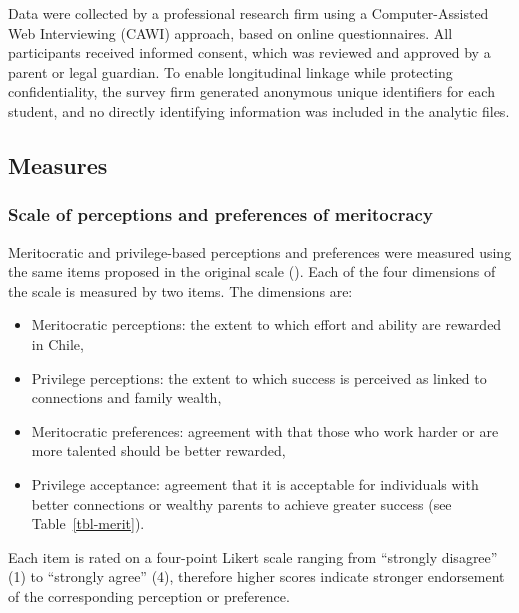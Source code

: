 \documentclass[
  13pt,
]{article}
\begin{document}
Data were collected by a professional research firm using a
Computer-Assisted Web Interviewing (CAWI) approach, based on online
questionnaires. All participants received informed consent, which was
reviewed and approved by a parent or legal guardian. To enable
longitudinal linkage while protecting confidentiality, the survey firm
generated anonymous unique identifiers for each student, and no directly
identifying information was included in the analytic files.

\subsection{Measures}\label{measures}

\subsubsection{Scale of perceptions and preferences of
meritocracy}\label{scale-of-perceptions-and-preferences-of-meritocracy}

Meritocratic and privilege-based perceptions and preferences were
measured using the same items proposed in the original scale
().
Each of the four dimensions of the scale is measured by two items. The
dimensions are:

\begin{itemize}
\item
  Meritocratic perceptions: the extent to which effort and ability are
  rewarded in Chile,
\item
  Privilege perceptions: the extent to which success is perceived as
  linked to connections and family wealth,
\item
  Meritocratic preferences: agreement with that those who work harder or
  are more talented should be better rewarded,
\item
  Privilege acceptance: agreement that it is acceptable for individuals
  with better connections or wealthy parents to achieve greater success
  (see Table~\ref{tbl-merit}).
\end{itemize}

Each item is rated on a four-point Likert scale ranging from ``strongly
disagree'' (1) to ``strongly agree'' (4), therefore higher scores
indicate stronger endorsement of the corresponding perception or
preference.
\end{document}
